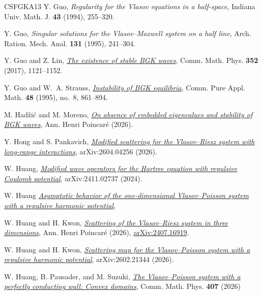 \documentclass[10pt,reqno]{amsart}
\theoremstyle{definition}
\begin{document}
{\begin{thebibliography}{CSFGKA13}
Y. Guo,
\emph{Regularity for the Vlasov equations in a half-space},
Indiana Univ. Math. J. \textbf{43} (1994), 255--320.

Y. Guo,
\emph{Singular solutions for the Vlasov--Maxwell system on a half line},
Arch. Ration. Mech. Anal. \textbf{131} (1995), 241--304.

Y. Guo and Z. Lin,
\href{https://link.springer.com/article/10.1007/s00220-017-2873-2}{\emph{The existence of stable BGK waves}},
Comm. Math. Phys. \textbf{352} (2017), 1121--1152.

Y. Guo and W.~A. Strauss,
\href{https://onlinelibrary.wiley.com/doi/abs/10.1002/cpa.3160480803}{\emph{Instability of BGK equilibria}},
Comm. Pure Appl. Math. \textbf{48} (1995), no.~8, 861--894.

M. Had\v{z}i\'c and M. Moreno,
\href{https://arxiv.org/abs/2412.07025}{\emph{On absence of embedded eigenvalues and stability of BGK waves}},
Ann. Henri Poincar\'e (2026).


Y. Hong and S. Pankavich,
\href{https://arxiv.org/abs/2604.04256}{\emph{Modified scattering for the Vlasov--Riesz system with long-range interactions}},
arXiv:2604.04256 (2026).




W. Huang,
\href{https://arxiv.org/abs/2411.02737}{\emph{Modified wave operators for the Hartree equation with repulsive Coulomb potential}},
arXiv:2411.02737 (2024).

W. Huang
\href{https://arxiv.org/abs/2610.02551}{\emph{Asymptotic behavior of the one-dimensional Vlasov--Poisson system with a repulsive harmonic potential}},



W. Huang and H. Kwon,
\href{https://link.springer.com/article/10.1007/s00023-026-01735-7}{\emph{Scattering of the Vlasov--Riesz system in three dimensions}},
Ann. Henri Poincar\'e (2026), \href{https://arxiv.org/abs/2407.16919}{arXiv:2407.16919}.

W. Huang and H. Kwon,
\href{https://arxiv.org/abs/2602.21344}{\emph{Scattering map for the Vlasov--Poisson system with a repulsive harmonic potential}},
arXiv:2602.21344 (2026).

W. Huang, B. Pausader, and M. Suzuki,
\href{https://arxiv.org/abs/2412.13434}{\emph{The Vlasov--Poisson system with a perfectly conducting wall: Convex domains}},
 Comm. Math. Phys. \textbf{407} (2026)


\end{thebibliography}}
\end{document}
